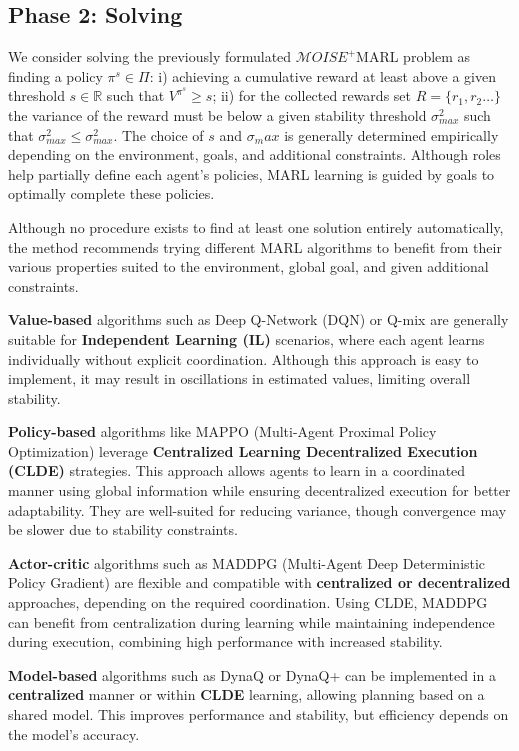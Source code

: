\documentclass[pdflatex,sn-mathphys-num]{sn-jnl}%
\theoremstyle{thmstyleone}%
\theoremstyle{thmstyletwo}%
\theoremstyle{thmstylethree}%
\begin{document}
\subsection{Phase 2: Solving}

We consider solving the previously formulated $\mathcal{M}OISE^+$MARL problem as finding a policy $\pi^s \in \Pi$: \quad i) achieving a cumulative reward at least above a given threshold $s \in \mathbb{R}$ such that $V^{\pi^s} \geq s$; \quad ii) for the collected rewards set $R = \{r_1, r_2\dots\}$ the variance of the reward must be below a given stability threshold $\sigma_{max}^2$ such that $\sigma_{max}^2 \leq \sigma_{max}^2$. The choice of $s$ and $\sigma_max$ is generally determined empirically depending on the environment, goals, and additional constraints. Although roles help partially define each agent's policies, MARL learning is guided by goals to optimally complete these policies.

Although no procedure exists to find at least one solution entirely automatically, the method recommends trying different MARL algorithms to benefit from their various properties suited to the environment, global goal, and given additional constraints.

\textbf{Value-based} algorithms such as Deep Q-Network (DQN) or Q-mix are generally suitable for \textbf{Independent Learning (IL)} scenarios, where each agent learns individually without explicit coordination. Although this approach is easy to implement, it may result in oscillations in estimated values, limiting overall stability.

\textbf{Policy-based} algorithms like MAPPO (Multi-Agent Proximal Policy Optimization) leverage \textbf{Centralized Learning Decentralized Execution (CLDE)} strategies. This approach allows agents to learn in a coordinated manner using global information while ensuring decentralized execution for better adaptability. They are well-suited for reducing variance, though convergence may be slower due to stability constraints.

\textbf{Actor-critic} algorithms such as MADDPG (Multi-Agent Deep Deterministic Policy Gradient) are flexible and compatible with \textbf{centralized or decentralized} approaches, depending on the required coordination. Using CLDE, MADDPG can benefit from centralization during learning while maintaining independence during execution, combining high performance with increased stability.

\textbf{Model-based} algorithms such as DynaQ or DynaQ+ can be implemented in a \textbf{centralized} manner or within \textbf{CLDE} learning, allowing planning based on a shared model. This improves performance and stability, but efficiency depends on the model's accuracy.
\end{document}
